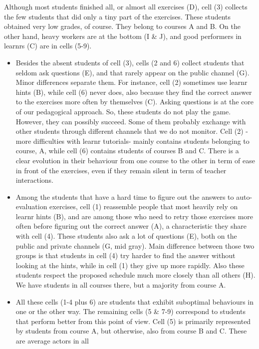 \documentclass{aims}
\theoremstyle{definition}
\begin{document}
Although most students finished all, or almost all exercises (D), cell
(3) collects the few students that did only a tiny part of the
exercises. These students obtained very low grades, of course. They
belong to courses A and B. On the other hand, heavy workers are at the
bottom (I \& J), and good performers in learnrs (C) are in cells (5-9).

\begin{itemize}
\item
  Besides the absent students of cell (3), cells (2 and 6) collect
  students that seldom ask questions (E), and that rarely appear on the
  public channel (G). Minor differences separate them. For instance,
  cell (2) sometimes use learnr hints (B), while cell (6) never does,
  also because they find the correct answer to the exercises more often
  by themselves (C). Asking questions is at the core of our pedagogical
  approach. So, these students do not play the game. However, they can
  possibly succeed. Some of them probably exchange with other students
  through different channels that we do not monitor. Cell (2) -more
  difficulties with learnr tutorials- mainly contains students belonging
  to course, A, while cell (6) contains students of courses B and C.
  There is a clear evolution in their behaviour from one course to the
  other in term of ease in front of the exercises, even if they remain
  silent in term of teacher interactions.
\item
  Among the students that have a hard time to figure out the answers to
  auto-evaluation exercises, cell (1) reassemble people that most
  heavily rely on learnr hints (B), and are among those who need to
  retry those exercises more often before figuring out the correct
  answer (A), a characteristic they share with cell (4). These students
  also ask a lot of questions (E), both on the public and private
  channels (G, mid gray). Main difference between those two groups is
  that students in cell (4) try harder to find the answer without
  looking at the hints, while in cell (1) they give up more rapidly.
  Also these students respect the proposed schedule much more closely
  than all others (H). We have students in all courses there, but a
  majority from course A.
\item
  All these cells (1-4 plus 6) are students that exhibit suboptimal
  behaviours in one or the other way. The remaining cells (5 \& 7-9)
  correspond to students that perform better from this point of view.
  Cell (5) is primarily represented by students from course A, but
  otherwise, also from course B and C. These are average actors in all

\end{itemize}
\end{document}
